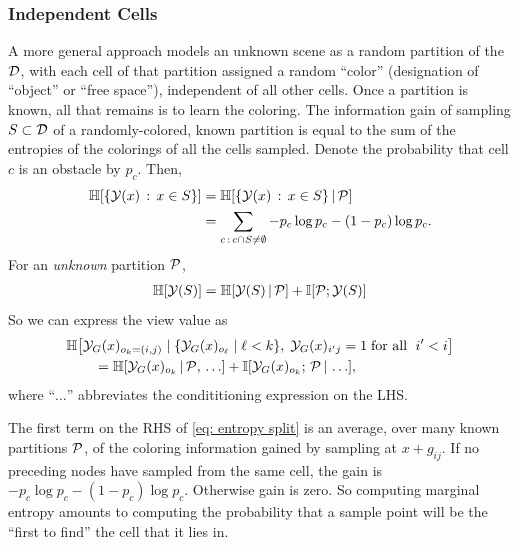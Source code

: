 \subsubsection{Independent Cells} \label{section: indcells}
A more general approach models an unknown scene as a 
random partition of the $\D$, with each cell of that partition assigned a random ``color''
(designation of ``object'' or ``free space''), independent of all other cells.
Once a partition is known, all that remains is to learn the coloring. 
The information gain of sampling $S\subs\D$ of a randomly-colored, known partition 
is equal to the sum of the entropies of the
colorings of all the cells sampled.
Denote the probability that cell $c$ is an obstacle by $p_c$.  Then,
\begin{align*}
\HH[\{\Y(x)\,:\,x\in S\}] &= \HH[\{\Y(x)\,:\,x\in S\}\,|\,\P]\\
&= \sum_{c\,:\,c\cap S\neq\emptyset} -p_c\log p_c - (1-p_c)\log p_c.
\end{align*}
For an \emph{unknown} partition $\P$, %
\begin{align}
\HH[\Y(S)] = \HH[\Y(S)\,|\,\P]  + \II[\P;\Y(S)]
\end{align}
So we can express the view value as
\begin{align}
&\HH\bigl[\Y_G(x)_{o_k=(i,j)}\;|\;
\{\Y_G(x)_{o_{\ell}}\;|\;\ell<k\},\;
\Y_G(x)_{i\1j}=1\;\text{for all $\;i\1<i$}
\bigr]\notag\\
&\qquad = \HH[\Y_G(x)_{o_k}\,|\,\P,\,\ldots] + \II[\Y_G(x)_{o_k};\,\P\,|\,\ldots], \label{eq: entropy split}
\end{align}
where ``$\ldots$'' abbreviates the condititioning expression on the LHS.

The first term on the RHS of \ref{eq: entropy split} is an average, over many known partitions  $\P$,
of the coloring information gained by sampling at $x+g_{ij}$.
If no preceding nodes have sampled from the same cell, the gain is
$-p_c\log p_c - (1-p_c)\log p_c$.  Otherwise gain is zero.
So computing marginal entropy amounts to computing the probability that a
sample point will be the ``first to find'' the cell that it lies in.

